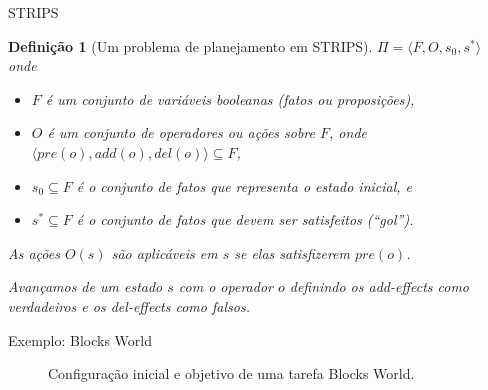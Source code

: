 \documentclass{beamer}
\newtheorem{definicao}{Definição}[section] %
\begin{document}
\begin{frame}{STRIPS}
  \begin{definicao}[Um problema de planejamento em STRIPS]
    $\Pi = \langle F, O, s_{0}, s^{*}\rangle$ onde
    \begin{itemize}
        \item $F$ é um conjunto de variáveis booleanas (\alert{fatos} ou \alert{proposições}),
        \item $O$ é um conjunto de \alert{operadores} ou ações sobre $F$, onde $\langle pre(o), add(o), del(o) \rangle \subseteq F$,
        \item $s_{0} \subseteq F$ é o conjunto de fatos que representa o \alert{estado inicial}, e
        \item $s^{*} \subseteq F$ é o conjunto de fatos que devem ser satisfeitos (``\alert{gol}'').
    \end{itemize}
   \pause
    As ações $O(s)$ são \alert{aplicáveis} em $s$ se elas satisfizerem $pre(o)$.

    Avançamos de um estado $s$ com o operador $o$ definindo os add-effects como \alert{verdadeiros} e os del-effects como \alert{falsos}.
\end{definicao}
\end{frame}

\begin{frame}{Exemplo: Blocks World}

\begin{figure}[ht]
\caption[]{Configuração inicial e objetivo de uma tarefa Blocks World.}
\centering
{}
\end{figure}
\end{frame}
\end{document}
